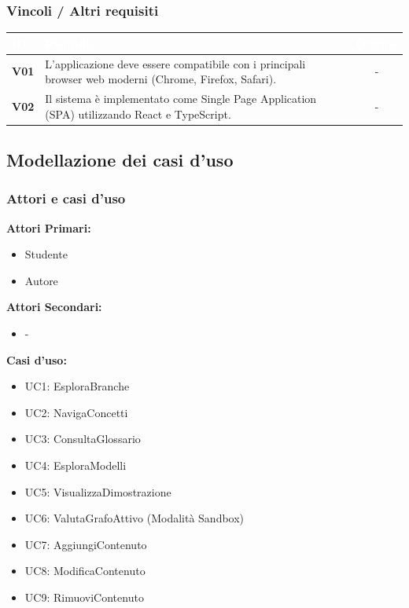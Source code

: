 \documentclass[12pt,a4paper]{article}
\begin{document}
\subsubsection{Vincoli / Altri requisiti}
\begin{table}[H]
    \centering
    \small
    \begin{tabularx}{\textwidth}{|l|X|c|}
        \hline
        \rowcolor{PrimaryBlue} \textcolor{white}{\textbf{ID}} & \textcolor{white}{\textbf{Requisito}} & \textcolor{white}{\textbf{Origine}} \\
        \hline
        \textbf{V01} & L'applicazione deve essere compatibile con i principali browser web moderni (Chrome, Firefox, Safari). & - \\
        \hline
        \rowcolor{CodeBg} \textbf{V02} & Il sistema è implementato come Single Page Application (SPA) utilizzando React e TypeScript. & - \\
        \hline
    \end{tabularx}
\end{table}

\subsection{Modellazione dei casi d'uso}
\subsubsection{Attori e casi d'uso}

\textbf{Attori Primari:}
\begin{itemize}
    \item Studente
    \item Autore
\end{itemize}

\textbf{Attori Secondari:}
\begin{itemize}
    \item -
\end{itemize}

\textbf{Casi d'uso:}
\begin{itemize}
    \item UC1: EsploraBranche
    \item UC2: NavigaConcetti
    \item UC3: ConsultaGlossario
    \item UC4: EsploraModelli
    \item UC5: VisualizzaDimostrazione
    \item UC6: ValutaGrafoAttivo (Modalità Sandbox)
    \item UC7: AggiungiContenuto
    \item UC8: ModificaContenuto
    \item UC9: RimuoviContenuto
\end{itemize}
\end{document}
